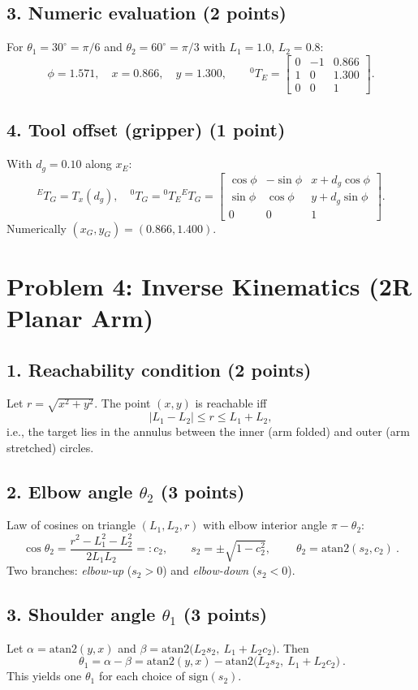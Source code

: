 \documentclass[11pt]{article}
\begin{document}
\subsection*{3. Numeric evaluation (2 points)}
For $\theta_1=30^\circ=\pi/6$ and $\theta_2=60^\circ=\pi/3$ with $L_1=1.0$, $L_2=0.8$:
\[
\phi=1.571,\quad x=0.866,\quad y=1.300,\qquad
{}^{0}\!T_E=\begin{bmatrix}0&-1&0.866\\ 1&0&1.300\\ 0&0&1\end{bmatrix}.
\]

\subsection*{4. Tool offset (gripper) (1 point)}
With $d_g=0.10$ along $x_E$:
\[
{}^{E}\!T_G=T_x(d_g),\quad
{}^{0}\!T_G={}^{0}\!T_E{}^{E}\!T_G=
\begin{bmatrix}
\cos\phi&-\sin\phi&x+d_g\cos\phi\\
\sin\phi& \cos\phi&y+d_g\sin\phi\\
0&0&1
\end{bmatrix}.
\]
Numerically $(x_G,y_G)=(0.866,1.400)$.

\section*{Problem 4: Inverse Kinematics (2R Planar Arm)}

\subsection*{1. Reachability condition (2 points)}
Let $r=\sqrt{x^2+y^2}$. The point $(x,y)$ is reachable iff
\[
\boxed{|L_1-L_2|\le r\le L_1+L_2},
\]
i.e., the target lies in the annulus between the inner (arm folded) and outer (arm stretched) circles.

\subsection*{2. Elbow angle $\theta_2$ (3 points)}
Law of cosines on triangle $(L_1,L_2,r)$ with elbow interior angle $\pi-\theta_2$:
\[
\cos\theta_2=\frac{r^2-L_1^2-L_2^2}{2L_1L_2}=:c_2,\qquad
s_2=\pm\sqrt{1-c_2^2},\qquad
\boxed{\ \theta_2=\mathrm{atan2}(s_2,c_2)\ }.
\]
Two branches: \emph{elbow-up} ($s_2>0$) and \emph{elbow-down} ($s_2<0$).

\subsection*{3. Shoulder angle $\theta_1$ (3 points)}
Let $\alpha=\mathrm{atan2}(y,x)$ and $\beta=\mathrm{atan2}\!\big(L_2 s_2,\ L_1+L_2 c_2\big)$. Then
\[
\boxed{\ \theta_1=\alpha-\beta
= \mathrm{atan2}(y,x)-\mathrm{atan2}\!\big(L_2 s_2,\ L_1+L_2 c_2\big)\ }.
\]
This yields one $\theta_1$ for each choice of $\mathrm{sign}(s_2)$.
\end{document}
